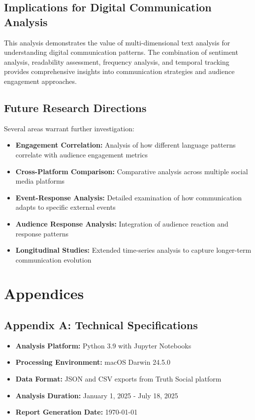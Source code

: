 \documentclass[12pt,a4paper]{article}
\begin{document}
\subsection{Implications for Digital Communication Analysis}

This analysis demonstrates the value of multi-dimensional text analysis for understanding digital communication patterns. The combination of sentiment analysis, readability assessment, frequency analysis, and temporal tracking provides comprehensive insights into communication strategies and audience engagement approaches.

\subsection{Future Research Directions}

Several areas warrant further investigation:

\begin{itemize}
    \item \textbf{Engagement Correlation:} Analysis of how different language patterns correlate with audience engagement metrics
    \item \textbf{Cross-Platform Comparison:} Comparative analysis across multiple social media platforms
    \item \textbf{Event-Response Analysis:} Detailed examination of how communication adapts to specific external events
    \item \textbf{Audience Response Analysis:} Integration of audience reaction and response patterns
    \item \textbf{Longitudinal Studies:} Extended time-series analysis to capture longer-term communication evolution
\end{itemize}

\section{Appendices}

\subsection{Appendix A: Technical Specifications}

\begin{itemize}
    \item \textbf{Analysis Platform:} Python 3.9 with Jupyter Notebooks
    \item \textbf{Processing Environment:} macOS Darwin 24.5.0
    \item \textbf{Data Format:} JSON and CSV exports from Truth Social platform
    \item \textbf{Analysis Duration:} January 1, 2025 - July 18, 2025
    \item \textbf{Report Generation Date:} \today
\end{itemize}
\end{document}
